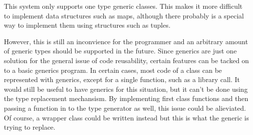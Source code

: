 \documentclass[nocopyrightspace,11pt,authoryear,preprint]{sigplanconf}
\begin{document}



This system only supports one type generic classes. This makes it more difficult
to implement data structures such as maps, although there probably is a special
way to implement them using structures such as tuples.

However, this is still an inconvience for the programmer
and an arbitrary amount of generic types should be supported in the future.
Since generics are just one solution for the general issue of code reusability,
certain features can be tacked on to a basic generics program.
In certain cases, most code of a class can be represented with generics, except
for a single function, such as a library call.  It would still be useful to have
generics for this situation, but it can't be done using the type replacement
mechansism.  By implementing first class functions and then passing a function in
to the type generator as well, this issue could be alieviated.  Of course,
a wrapper class could be written instead but this is what the generic is trying
to replace.




\end{document}
